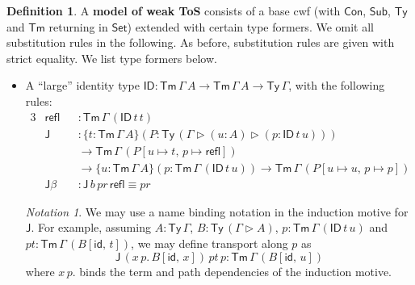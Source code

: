 \documentclass[12pt,a4paper,twoside,openany]{book}
\theoremstyle{remark}
\newtheorem{notation}{Notation}
\theoremstyle{definition}
\newtheorem{mydefinition}{Definition}
\theoremstyle{theorem}
\newcommand{\mi}[1]{\mathit{#1}}
\newcommand{\ms}[1]{\mathsf{#1}}
\newcommand{\J}{\ms{J}}
\newcommand{\refl}{\mathsf{refl}}
\newcommand{\id}{\mathsf{id}}
\newcommand{\Con}{\mathsf{Con}}
\newcommand{\Sub}{\mathsf{Sub}}
\newcommand{\Tm}{\mathsf{Tm}}
\newcommand{\Ty}{\mathsf{Ty}}
\newcommand{\ID}{\mathsf{ID}}
\newcommand{\Set}{\mathsf{Set}}
\newcommand{\ext}{\triangleright}
\begin{document}
\begin{mydefinition}
A \textbf{model of weak ToS} consists of a base cwf (with $\Con$, $\Sub$, $\Ty$
and $\Tm$ returning in $\Set$) extended with certain type formers. We omit all
substitution rules in the following. As before, substitution rules are given
with strict equality. We list type formers below.
\begin{itemize}
\item
  A ``large'' identity type $\ID : \Tm\,\Gamma\,A \to \Tm\,\Gamma\,A \to
  \Ty\,\Gamma$, with the following rules:
  \begin{alignat*}{3}
  & \refl &&: \Tm\,\Gamma\,(\ID\,t\,t)\\
  & \J &&: \{t : \Tm\,\Gamma\,A\}
         (P : \Ty\,(\Gamma\ext(u : A)\ext(p : \ID\,t\,u)))\\
  & &&\to \Tm\,\Gamma\,(P[u \mapsto t,\,p \mapsto \refl])\\
  & &&\to \{u : \Tm\,\Gamma\,A\}
           (p : \Tm\,\Gamma\,(\ID\,t\,u))
  \to \Tm\,\Gamma\,(P[u \mapsto u,\,p \mapsto p])\\
  &\J\beta &&: \J\,b\,\mi{pr}\,\refl \equiv \mi{pr}
  \end{alignat*}

  \begin{notation}
    We may use a name binding notation in the induction motive for $\J$. For
    example, assuming $A : \Ty\,\Gamma$, $B : \Ty\,(\Gamma \ext A)$, $p :
    \Tm\,\Gamma\,(\ID\,t\,u)$ and $\mi{pt} : \Tm\,\Gamma\,(B[\id,\,t])$, we may
    define transport along $p$ as
    \[
      \J\,(x\,p.\,B[\id,\,x])\,\mi{pt}\,p : \Tm\,\Gamma\,(B[\id,\,u])
    \]
    where $x\,p.$ binds the term and path dependencies of the induction motive.
  \end{notation}


\end{itemize}
\end{mydefinition}
\end{document}
